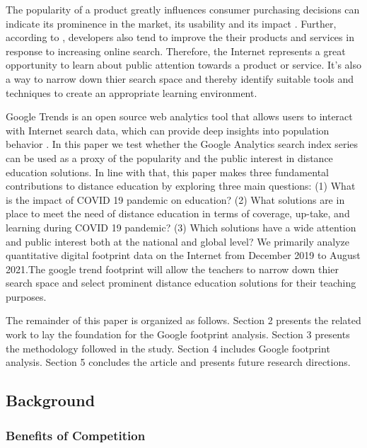 \documentclass[11pt,a4paper,]{article}
\begin{document}
The popularity of a product greatly influences consumer purchasing decisions can indicate its prominence in the market, its usability and its impact \autocite{ahn2006utilizing}. Further, according to \textcite{willis2020using}, developers also tend to improve the their products and services in response to increasing online search. Therefore, the Internet represents a great opportunity to learn about public attention towards a product or service. It's also a way to narrow down thier search space and thereby identify suitable tools and techniques to create an appropriate learning environment.

Google Trends is an open source web analytics tool that allows users to interact with Internet search data, which can provide deep insights into population behavior \autocite{nuti2014use}. In this paper we test whether the Google Analytics search index series can be used as a proxy of the popularity and the public interest in distance education solutions. In line with that, this paper makes three fundamental contributions to distance education by exploring three main questions: (1) What is the impact of COVID 19 pandemic on education? (2) What solutions are in place to meet the need of distance education in terms of coverage, up-take, and learning during COVID 19 pandemic? (3) Which solutions have a wide attention and public interest both at the national and global level?
We primarily analyze quantitative digital footprint data on the Internet from December 2019 to August 2021.The google trend footprint will allow the teachers to narrow down thier search space and select prominent distance education solutions for their teaching purposes.

The remainder of this paper is organized as follows. Section 2 presents the related work to lay the foundation for the Google footprint analysis. Section 3 presents the methodology followed in the study. Section 4 includes Google footprint analysis. Section 5 concludes the article and presents future research directions.

\hypertarget{background}{%
\subsection{Background}\label{background}}

\hypertarget{benefits-of-competition}{%
\subsubsection{Benefits of Competition}\label{benefits-of-competition}}
\end{document}
